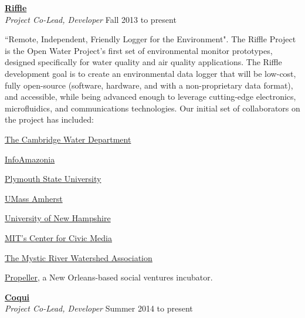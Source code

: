 \documentclass[10pt]{article}
\newcommand{\blankline}{\quad\pagebreak[3]}
\newcommand{\halfblankline}{\quad\vspace{-0.5\baselineskip}\pagebreak[3]}
\begin{document}
\blankline


\href{http://publiclab.org/wiki/riffle}{\textbf{Riffle}} \\
\emph{Project Co-Lead, Developer} \hfill {Fall 2013 to present} 

\halfblankline

``Remote, Independent, Friendly Logger for the Environment".  The Riffle Project is the Open Water Project's first set of environmental monitor prototypes, designed specifically for water quality and air quality applications. The Riffle development goal is to create an environmental data logger that will be low-cost, fully open-source (software, hardware, and with a non-proprietary data format), and  accessible, while being advanced enough to leverage cutting-edge electronics, microfluidics, and communications technologies.  
Our initial set of collaborators on the project has included:
\begin{innerlist}
        \item \href{https://www.cambridgema.gov/Water.aspx}{The Cambridge Water Department}
        \item \href{http://www.amherstmedia.org/makers}{InfoAmazonia}
\item \href{http://plymouth.edu}{Plymouth State University}
\item \href{http://umass.edu}{UMass Amherst}
\item \href{http://unh.edu}{University of New Hampshire}
\item \href{http://civic.mit.edu}{MIT's Center for Civic Media}
\item \href{http://http://mysticriver.org/}{The Mystic River Watershed Association}
\item \href{http://gopropeller.org/}{Propeller}, a New Orleans-based social ventures incubator.
\end{innerlist}

\blankline


\href{http://publiclab.org/wiki/coqui}{\textbf{Coqui}} \\
\emph{Project Co-Lead, Developer} \hfill {Summer 2014 to present} 

\halfblankline
\end{document}
